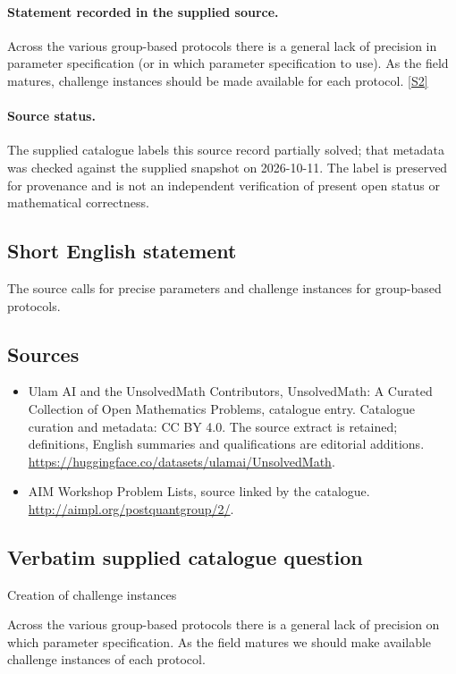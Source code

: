 \documentclass[11pt]{article}
\begin{document}
\paragraph{Statement recorded in the supplied source.}
Across the various group-based protocols there is a general lack of precision in parameter specification (or in which parameter specification to use). As the field matures, challenge instances should be made available for each protocol. \href{http://aimpl.org/postquantgroup/2/}{[S2]}
\paragraph{Source status.}
The supplied catalogue labels this source record partially solved; that metadata was checked against the supplied snapshot on 2026-10-11. The label is preserved for provenance and is not an independent verification of present open status or mathematical correctness.
\subsection{Short English statement}
The source calls for precise parameters and challenge instances for group-based protocols.
\subsection{Sources}
\begin{itemize}
\item[S1] Ulam AI and the UnsolvedMath Contributors, UnsolvedMath: A Curated Collection of Open Mathematics Problems, catalogue entry. Catalogue curation and metadata: CC BY 4.0. The source extract is retained; definitions, English summaries and qualifications are editorial additions.
\url{https://huggingface.co/datasets/ulamai/UnsolvedMath}.
\item[S2] AIM Workshop Problem Lists, source linked by the catalogue.
\url{http://aimpl.org/postquantgroup/2/}.
\end{itemize}
\subsection{Verbatim supplied catalogue question}
Creation of challenge instances

Across the various group-based protocols there is a general lack of precision on which parameter specification. As the field matures we should make available challenge instances of each protocol.
\end{document}
